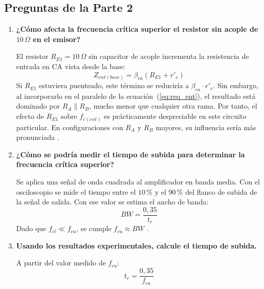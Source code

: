 \documentclass[journal]{IEEEtran}
\begin{document}
\subsection{Preguntas de la Parte 2}

\begin{enumerate}

\item \textbf{¿C\'omo afecta la frecuencia cr\'itica superior el resistor sin acople de $10\,\Omega$ en el emisor?}

El resistor $R_{E1} = 10\,\Omega$ sin capacitor de acople incrementa la resistencia de entrada en CA vista desde la base:
\begin{equation}
    Z_{ent(base)} = \beta_{ca}(R_{E1} + r'_e)
\end{equation}
Si $R_{E1}$ estuviera puenteado, este t\'ermino se reducir\'ia a $\beta_{ca} \cdot r'_e$. Sin embargo, al incorporarlo en el paralelo de la ecuaci\'on~(\ref{eq:req_ent}), el resultado est\'a dominado por $R_A\|R_B$, mucho menor que cualquier otra rama. Por tanto, el efecto de $R_{E1}$ sobre $f_{c(ent)}$ es pr\'acticamente despreciable en este circuito particular. En configuraciones con $R_A$ y $R_B$ mayores, su influencia ser\'ia m\'as pronunciada \cite{Floyd2008}.

\item \textbf{¿C\'omo se podr\'ia medir el tiempo de subida para determinar la frecuencia cr\'itica superior?}

Se aplica una se\~nal de onda cuadrada al amplificador en banda media. Con el osciloscopio se mide el tiempo entre el $10\,\%$ y el $90\,\%$ del flanco de subida de la se\~nal de salida. Con ese valor se estima el ancho de banda:
\begin{equation}
    BW = \frac{0{,}35}{t_r}
    \label{eq:bw}
\end{equation}
Dado que $f_{cl} \ll f_{cu}$, se cumple $f_{cu} \approx BW$ \cite{Floyd2008}.

\item \textbf{Usando los resultados experimentales, calcule el tiempo de subida.}

A partir del valor medido de $f_{cu}$:
\begin{equation}
    t_r = \frac{0{,}35}{f_{cu}}
    \label{eq:tr}
\end{equation}

\end{enumerate}
\end{document}
